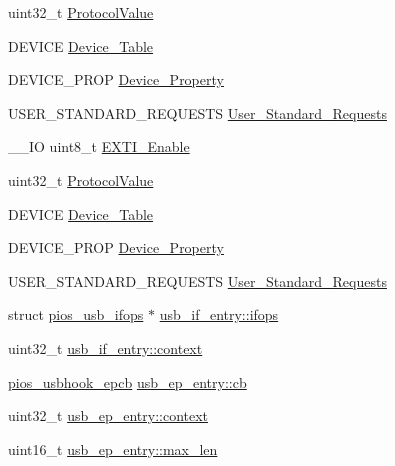 \begin{DoxyCompactItemize}
\item 
uint32\-\_\-t \hyperlink{group___p_i_o_s___u_s_b_h_o_o_k_ga271c451896dad2b849277faad3eb3ea6}{\-Protocol\-Value}
\item 
\-D\-E\-V\-I\-C\-E \hyperlink{group___p_i_o_s___u_s_b_h_o_o_k_gafa47e7c7d5d6fb4c682e16c89c1b7d75}{\-Device\-\_\-\-Table}
\item 
\-D\-E\-V\-I\-C\-E\-\_\-\-P\-R\-O\-P \hyperlink{group___p_i_o_s___u_s_b_h_o_o_k_ga646bdfc60e69ee637f2c39b5bb91dfec}{\-Device\-\_\-\-Property}
\item 
\-U\-S\-E\-R\-\_\-\-S\-T\-A\-N\-D\-A\-R\-D\-\_\-\-R\-E\-Q\-U\-E\-S\-T\-S \hyperlink{group___p_i_o_s___u_s_b_h_o_o_k_ga8d70d0a7e05cf9c172e4304def6b65b8}{\-User\-\_\-\-Standard\-\_\-\-Requests}
\item 
\-\_\-\-\_\-\-I\-O uint8\-\_\-t \hyperlink{group___p_i_o_s___u_s_b_h_o_o_k_ga80e4a20c4f7576283232cda440c47694}{\-E\-X\-T\-I\-\_\-\-Enable}
\item 
uint32\-\_\-t \hyperlink{group___p_i_o_s___u_s_b_h_o_o_k_ga271c451896dad2b849277faad3eb3ea6}{\-Protocol\-Value}
\item 
\-D\-E\-V\-I\-C\-E \hyperlink{group___p_i_o_s___u_s_b_h_o_o_k_gafa47e7c7d5d6fb4c682e16c89c1b7d75}{\-Device\-\_\-\-Table}
\item 
\-D\-E\-V\-I\-C\-E\-\_\-\-P\-R\-O\-P \hyperlink{group___p_i_o_s___u_s_b_h_o_o_k_ga646bdfc60e69ee637f2c39b5bb91dfec}{\-Device\-\_\-\-Property}
\item 
\-U\-S\-E\-R\-\_\-\-S\-T\-A\-N\-D\-A\-R\-D\-\_\-\-R\-E\-Q\-U\-E\-S\-T\-S \hyperlink{group___p_i_o_s___u_s_b_h_o_o_k_ga8d70d0a7e05cf9c172e4304def6b65b8}{\-User\-\_\-\-Standard\-\_\-\-Requests}
\item 
struct \hyperlink{structpios__usb__ifops}{pios\-\_\-usb\-\_\-ifops} $\ast$ \hyperlink{group___p_i_o_s___u_s_b_h_o_o_k_ga8c6a8d1a868734fd250c8af665a54c3c}{usb\-\_\-if\-\_\-entry\-::ifops}
\item 
uint32\-\_\-t \hyperlink{group___p_i_o_s___u_s_b_h_o_o_k_gad9a6d740530f937ee0fd2870b5c02ce8}{usb\-\_\-if\-\_\-entry\-::context}
\item 
\hyperlink{group___p_i_o_s___u_s_b_h_o_o_k_ga5f7904cd3922ab7207afebe3d9ef2650}{pios\-\_\-usbhook\-\_\-epcb} \hyperlink{group___p_i_o_s___u_s_b_h_o_o_k_gaf0106468de445de05247315a6001789c}{usb\-\_\-ep\-\_\-entry\-::cb}
\item 
uint32\-\_\-t \hyperlink{group___p_i_o_s___u_s_b_h_o_o_k_ga044e4671681d96fdf1918abb9e52542e}{usb\-\_\-ep\-\_\-entry\-::context}
\item 
uint16\-\_\-t \hyperlink{group___p_i_o_s___u_s_b_h_o_o_k_ga010957cf5bf2628ba64249b8c1271f91}{usb\-\_\-ep\-\_\-entry\-::max\-\_\-len}
\end{DoxyCompactItemize}


